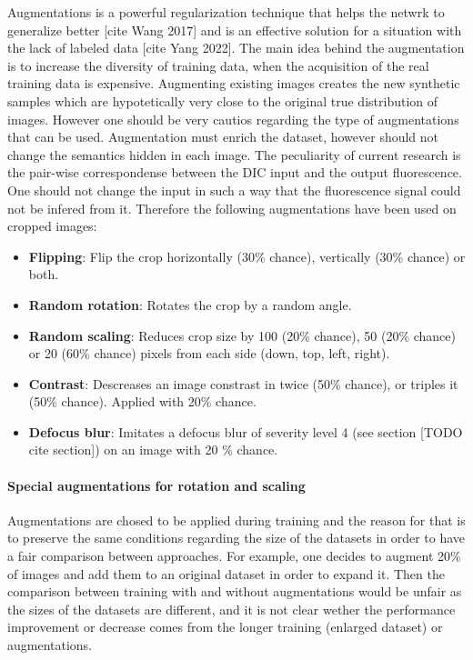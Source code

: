 Augmentations is a powerful regularization technique that helps the netwrk to generalize better [cite Wang 2017] and is an effective solution for a situation with the lack of labeled data [cite Yang 2022]. The main idea behind the augmentation is to increase the diversity of training data, when the acquisition of the real training data is expensive. Augmenting existing images creates the new synthetic samples which are hypotetically very close to the original true distribution of images. However one should be very cautios regarding the type of augmentations that can be used. Augmentation must enrich the dataset, however should not change the semantics hidden in each image. The peculiarity of current research is the pair-wise correspondense between the DIC input and the output fluorescence. One should not change the input in such a way that the fluorescence signal could not be infered from it. Therefore the following augmentations have been used on cropped images:

\begin{itemize}
	\item \textbf{Flipping}: Flip the crop horizontally (30\% chance), vertically (30\% chance) or both.
	\item \textbf{Random rotation}: Rotates the crop by a random angle.
	\item \textbf{Random scaling}: Reduces crop size by 100 (20\% chance), 50 (20\% chance) or 20 (60\% chance) pixels from each side (down, top, left, right).
	\item \textbf{Contrast}: Descreases an image constrast in twice (50\% chance), or triples it (50\% chance). Applied with 20\% chance.
	\item \textbf{Defocus blur}: Imitates a defocus blur of severity level 4 (see section [TODO cite section]) on an image with 20 \% chance.
\end{itemize}

\paragraph{Special augmentations for rotation and scaling}

Augmentations are chosed to be applied during training and the reason for that is to preserve the same conditions regarding the size of the datasets in order to have a fair comparison between approaches. For example, one decides to augment 20\% of images and add them to an original dataset in order to expand it. Then the comparison between training with and without augmentations would be unfair as the sizes of the datasets are different, and it is not clear wether the performance improvement or decrease comes from the longer training (enlarged dataset) or augmentations. 

